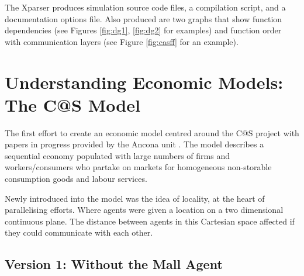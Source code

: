 \documentclass[a4paper,11pt]{article}
\begin{document}
The Xparser produces simulation source code files, a compilation script, and a documentation options file. 
Also produced are two graphs that show function dependencies (see Figures \ref{fig:dg1}, \ref{fig:dg2} for examples) and function order with communication layers (see Figure \ref{fig:casff} for an example).




\pagebreak

\section{Understanding Economic Models: The C@S Model}

The first effort to create an economic model centred around the C@S
project with papers in progress provided by the Ancona unit \cite{CATALANO:2006}. The model describes
a sequential economy populated with large numbers of firms and
workers/consumers who partake on markets for homogeneous
non-storable consumption goods and labour services.

Newly introduced into the model was the idea of locality, at the
heart of parallelising efforts. Where agents were given a location
on a two dimensional continuous plane. The distance between agents
in this Cartesian space affected if they could communicate with each
other.


\subsection{Version 1: Without the Mall Agent}
\end{document}
